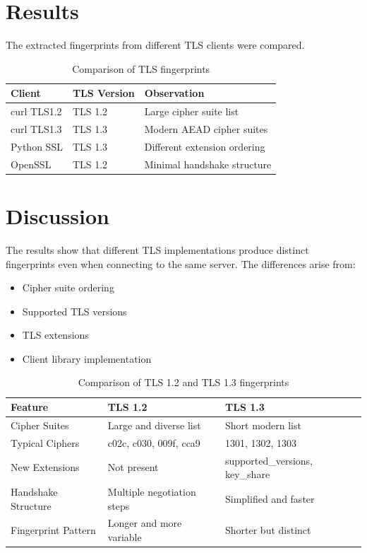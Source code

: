 \documentclass[12pt]{article}
\begin{document}
\clearpage
\section*{Results}

The extracted fingerprints from different TLS clients were compared.

\begin{table}[H]
\centering
\begin{tabular}{lll}
\toprule
Client & TLS Version & Observation \\
\midrule
curl TLS1.2 & TLS 1.2 & Large cipher suite list \\
curl TLS1.3 & TLS 1.3 & Modern AEAD cipher suites \\
Python SSL & TLS 1.3 & Different extension ordering \\
OpenSSL & TLS 1.2 & Minimal handshake structure \\
\bottomrule
\end{tabular}
\caption{Comparison of TLS fingerprints}
\end{table}

\section*{Discussion}

The results show that different TLS implementations produce distinct fingerprints even when connecting to the same server. The differences arise from:

\begin{itemize}
\item Cipher suite ordering
\item Supported TLS versions
\item TLS extensions
\item Client library implementation
\end{itemize}


\begin{table}[H]
\centering
\begin{tabular}{lll}
\toprule
Feature & TLS 1.2 & TLS 1.3 \\
\midrule
Cipher Suites & Large and diverse list & Short modern list \\
Typical Ciphers & c02c, c030, 009f, cca9 & 1301, 1302, 1303 \\
New Extensions & Not present & supported\_versions, key\_share \\
Handshake Structure & Multiple negotiation steps & Simplified and faster \\
Fingerprint Pattern & Longer and more variable & Shorter but distinct \\
\bottomrule
\end{tabular}
\caption{Comparison of TLS 1.2 and TLS 1.3 fingerprints}
\end{table}
\end{document}
